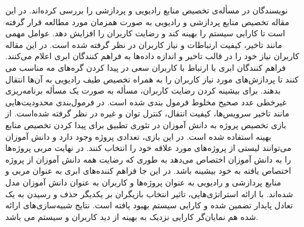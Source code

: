     نویسندگان در \cite{gu2018joint} مسأله‌ی تخصیص منابع رادیویی و پردازشی را بررسی کرده‌اند.
    در این مقاله تخصیص منابع پردازشی و رادیویی به صورت همزمان مورد مطالعه قرار گرفته است تا کارایی سیستم را بهینه کند و رضایت کاربران را افزایش دهد.
    عوامل مهمی مانند تاخیر، کیفیت ارتباطات و نیاز کاربران در نظر گرفته شده است.
    در این مقاله کاربران نیاز خود را در قالب تاخیر و اندازه داده‌ها به فراهم کنندگان ابری اعلام می‌کنند.
    فراهم کنندگان ابری با ارتباط با کاربران سعی در پیدا کردن گره‌های  مه مناسب می کنند تا پردازش‌های مورد نیاز کاربران را به همراه تخصیص طیف رادیویی به آن‌ها انتقال بدهند.
    برای بیشینه کردن رضایت کاربران، مسأله به صورت یک مسأله برنامه‌ریزی غیرخطی عدد صحیح مخلوط فرمول بندی شده است.
    در فرمول‌بندی محدودیت‌هایی مانند تاخیر سرویس‌ها، کیفیت انتقال، کنترل توان و غیره در نظر گرفته شده‌است.
    از بازی تخصیص پروژه به دانش آموزان در تئوری تطبیق برای پیدا کردن تخصیص منابع بهینه استفاده شده است.
    در این بازی، تعدادی پروژه وجود دارد و دانش آموزان می‌توانند لیستی از پروژه‌های مورد علاقه خود را انتخاب کنند.
    در نهایت مربی پروژه‌ها را به دانش آموزان اختصاص می‌دهد به طوری که رضایت همه دانش آموزان از پروژه اختصاص یافته به خود بیشینه باشد.
    در این جا فراهم کننده‌های ابری به عنوان مربی و منابع پردازشی و رادیویی به عنوان پروژه‌ها و کاربران به عنوان دانش آموزان مدل شده‌اند.
    با ارائه استراتژی‌هایی، تاثیر انتخاب بازیگران بر یکدیگر حذف و رسیدن به یک تعادل پایدار تضمین شده و کارایی سیستم بهبود یافته است.
    نتایج شبیه‌سازی‌های ارائه شده هم نمایان‌گر کارایی نزدیک به بهینه از دید کاربران و سیستم می باشد.